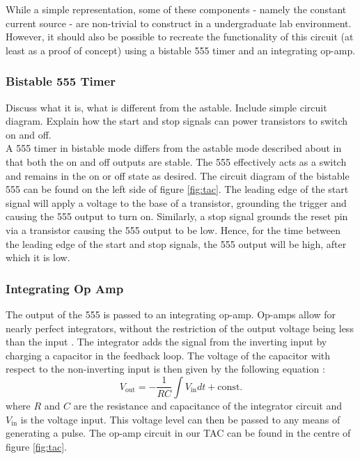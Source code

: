 \documentclass[%
 reprint,
 amsmath,amssymb,
 aps,
]{revtex4-2}
\begin{document}
        While a simple representation, some of these components - namely the constant current source - are non-trivial to construct in a undergraduate lab environment. However, it should also be possible to recreate the functionality of this circuit (at least as a proof of concept) using a bistable 555 timer and an integrating op-amp.

        \subsubsection{Bistable 555 Timer}
        Discuss what it is, what is different from the astable. Include simple circuit diagram. Explain how the start and stop signals can power transistors to switch on and off.\\

        A 555 timer in bistable mode differs from the astable mode described about in that both the on and off outputs are stable. The 555 effectively acts as a switch and remains in the on or off state as desired. The circuit diagram of the bistable 555 can be found on the left side of figure \ref{fig:tac}. The leading edge of the start signal will apply a voltage to the base of a transistor, grounding the trigger and causing the 555 output to turn on. Similarly, a stop signal grounds the reset pin via a transistor causing the 555 output to be low. Hence, for the time between the leading edge of the start and stop signals, the 555 output will be high, after which it is low.

        \subsubsection{Integrating Op Amp}
        The output of the 555 is passed to an integrating op-amp. Op-amps allow for nearly perfect integrators, without the restriction of the output voltage being less than the input \cite{horowitz}. The integrator adds the signal from the inverting input by charging a capacitor in the feedback loop. The voltage of the capacitor with respect to the non-inverting input is then given by the following equation \cite{horowitz}:
        \begin{equation}
            V_\text{out} = -\frac{1}{RC} \int V_\text{in} dt + \text{const.}
            \label{eq:integrator}
        \end{equation}where $R$ and $C$ are the resistance and capacitance of the integrator circuit and $V_\text{in}$ is the voltage input. This voltage level can then be passed to any means of generating a pulse. The op-amp circuit in our TAC can be found in the centre of figure \ref{fig:tac}.
\end{document}
